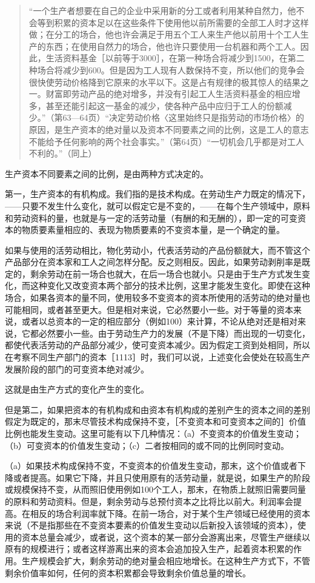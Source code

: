 \begin{quote}{“一个生产者想要在自己的企业中采用新的分工或者利用某种自然力，他不会等到积累的资本足以在这些条件下使用他以前所需要的全部工人时才这样做；在分工的场合，他也许会满足于用五个工人来生产他以前用十个工人生产的东西；在使用自然力的场合，他也许只要使用一台机器和两个工人。因此，生活资料基金［以前等于3000］，在第一种场合将减少到1500，在第二种场合将减少到600。但是因为工人现有人数保持不变，所以他们的竞争会很快使劳动价格降到它原来的水平以下。这是占有规律的极其惊人的结果之一。财富即劳动产品的绝对增多，并没有引起工人生活资料基金的相应增多，甚至还能引起这一基金的减少，使各种产品中应归于工人的份额减少。”（第63—64页）“决定劳动价格〈这里始终只是指劳动的市场价格〉的原因，是生产资本的绝对量以及资本不同要素之间的比例，这是工人的意志不能给予任何影响的两个社会事实。”（第64页）“一切机会几乎都是对工人不利的。”（同上）}\end{quote}

生产资本不同要素之间的比例，是由两种方式决定的。

第一，生产资本的有机构成。我们指的是技术构成。在劳动生产力既定的情况下，——只要不发生什么变化，就可以假定它是不变的，——在每个生产领域中，原料和劳动资料的量，也就是与一定的活劳动量（有酬的和无酬的），即一定的可变资本的物质要素量相应的、表现为物质要素的不变资本量，是一个确定的量。

如果与使用的活劳动相比，物化劳动小，代表活劳动的产品份额就大，而不管这个产品部分在资本家和工人之间怎样分配。反之则相反。因此，如果劳动剥削率是既定的，剩余劳动在前一场合也就大，在后一场合也就小。只是由于生产方式发生变化，而这种变化又改变资本两个部分的技术比例，这里才能发生变化。即使在这种场合，如果各资本的量不同，使用较多不变资本的资本所使用的活劳动的绝对量也可能相同，或者甚至更大。但是相对来说，它必然要小一些。对于等量的资本来说，或者以总资本的一定的相应部分（例如100）来计算，不论从绝对还是相对来说，它都必然要小一些。由于劳动生产力的发展（不是下降）而出现的一切变化，都使代表活劳动的产品部分减少，使可变资本减少。因为假定工资到处相同，所以在考察不同生产部门的资本［1113］时，我们可以说，上述变化会使处在较高生产发展阶段的部门的可变资本绝对减少。

这就是由生产方式的变化产生的变化。

但是第二，如果把资本的有机构成和由资本有机构成的差别产生的资本之间的差别假定为既定的，那末尽管技术构成保持不变，［不变资本和可变资本之间的］价值比例也能发生变动。这里可能有以下几种情况：（a）不变资本的价值发生变动；（b）可变资本的价值发生变动；（c）二者按相同的或不同的比例同时变动。

（a）如果技术构成保持不变，不变资本的价值发生变动，那末，这个价值或者下降或者提高。如果它下降，并且只使用原有的活劳动量，就是说，如果生产的阶段或规模保持不变，从而照旧使用例如100个工人，那末，在物质上就照旧需要同量的原料和劳动资料。但是，剩余劳动与总预付资本之比将比以前大。利润率会提高。在相反的场合利润率就下降。在前一场合，对于某个生产领域已经使用的资本来说（不是指那些在不变资本要素的价值发生变动以后新投入该领域的资本），使用的资本总量会减少，或者说，这个资本的某一部分会游离出来，尽管生产继续以原有的规模进行；或者这样游离出来的资本会追加投入生产，起着资本积累的作用。生产规模会扩大，剩余劳动的绝对量会相应地增长。在这种生产方式下，不管剩余价值率如何，任何的资本积累都会导致剩余价值总量的增长。

